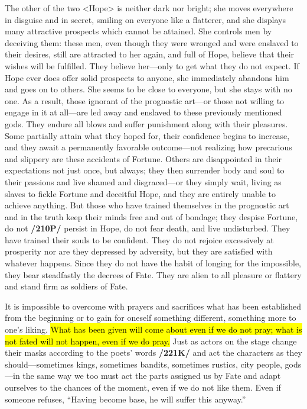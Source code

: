 The other of the two <Hope> is neither dark nor bright; she moves everywhere in disguise and in secret, smiling on everyone like a flatterer, and she displays many attractive prospects which cannot be attained. She controls men by deceiving them: these men, even though they were wronged and were enslaved to their desires, still are attracted to her again, and full of Hope, believe that their wishes will be fulfilled. They believe her—only to get what they do not expect. If Hope ever does offer solid prospects to anyone, she immediately abandons him and goes on to others. She seems to be close to everyone, but she stays with no one. As a result, those ignorant of the prognostic art—or those not willing to engage in it at all—are led
away and enslaved to these previously mentioned gods. They endure all blows and suffer punishment along with their pleasures. Some partially attain what they hoped for, their confidence begins to increase, and they await a permanently favorable outcome—not realizing how precarious and slippery are these accidents of Fortune. Others are disappointed in their expectations not just once, but always; they then surrender body and soul to their passions and live shamed and disgraced—or they simply wait, living as slaves to fickle Fortune and deceitful Hope, and they are entirely unable to achieve anything. But those who have trained themselves in the prognostic art and in the truth keep their minds free and out of bondage; they despise Fortune, do not \textbf{/210P/} persist in Hope, do not fear death, and live undisturbed. They have trained their souls to be confident. They do not rejoice excessively at prosperity nor are they depressed by adversity, but they are satisfied with whatever happens. Since they do not have the habit of longing for the impossible, they bear steadfastly the decrees of Fate. They are alien to all pleasure or flattery and stand firm as soldiers of Fate.

It is impossible to overcome with prayers and sacrifices what has been established from the beginning or to gain for oneself something different, something more to one’s liking. \hl{What has been given will come about even if we do not pray; what is not fated will not happen, even if we do pray.} Just as actors on the stage change their masks according to the poets’ words \textbf{/221K/} and act the characters as they should—sometimes kings, sometimes bandits, sometimes rustics, city people, gods—in the same way we too must act the parts assigned us by Fate and adapt ourselves to the chances of the moment, even if we do not like them. Even if someone refuses,
“Having become base, he will suffer this anyway.” 

